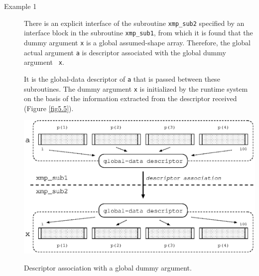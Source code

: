 \begin{description}

\item[Example 1]

	   There is an explicit interface of the subroutine
	   {\tt xmp\_sub2} specified by an interface block in the
	   subroutine {\tt xmp\_sub1}, from which it is found that the
	   dummy argument {\tt x} is a global assumed-shape
	   array. Therefore, the global actual argument {\tt a} is
	   descriptor associated with the global dummy argument {\tt
	   x}.

	   It is the global-data descriptor of {\tt a} that is passed
	   between these subroutines. The dummy argument {\tt x} is
	   initialized by the {\XMP} runtime system on the basis of the
	   information extracted from the descriptor received (Figure
	   \ref{fig5.5}).


\begin{myfigure}
 \includegraphics[scale=0.7]{figs/fig5.5.eps}
 \caption{Descriptor association with a global dummy argument.}
 \label{fig5.5}
\end{myfigure}


\end{description}
